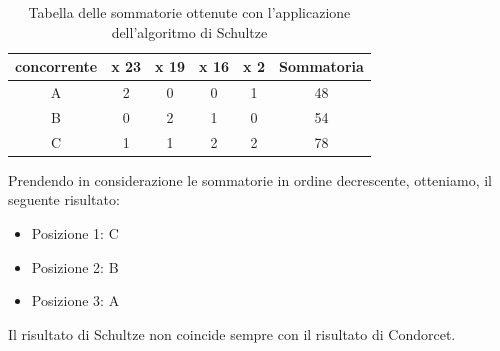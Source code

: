 \documentclass[12pt,a4paper,openright,twoside]{book}
\begin{document}
\begin{table}[H]
    \centering
    \begin{tabular}{|c|c|c|c|c|c|}
    \hline
    \multicolumn{1}{|l|}{concorrente} & \multicolumn{1}{|l|}{x 23} & \multicolumn{1}{|l|}{x 19} & \multicolumn{1}{l|}{x 16} & \multicolumn{1}{l|}{x 2} & \multicolumn{1}{l|}{Sommatoria} \\ \hline
    A & 2 & 0 & 0 & 1 & 48                              \\ \hline
    B & 0 & 2 & 1 & 0 & 54                              \\ \hline
    C & 1 & 1 & 2 & 2 & 78                             \\ \hline
  
    \end{tabular}
    \caption{Tabella delle sommatorie ottenute con l'applicazione dell'algoritmo di Schultze}
    \label{table:risultatischultze}
\end{table}
\newpage
Prendendo in considerazione le sommatorie in ordine decrescente, otteniamo, il seguente risultato:
\begin{itemize}
    \item{Posizione 1: C}
    \item{Posizione 2: B}
    \item{Posizione 3: A}
\end{itemize} 

Il risultato di Schultze non coincide sempre con il risultato di Condorcet.

\newpage
\end{document}
